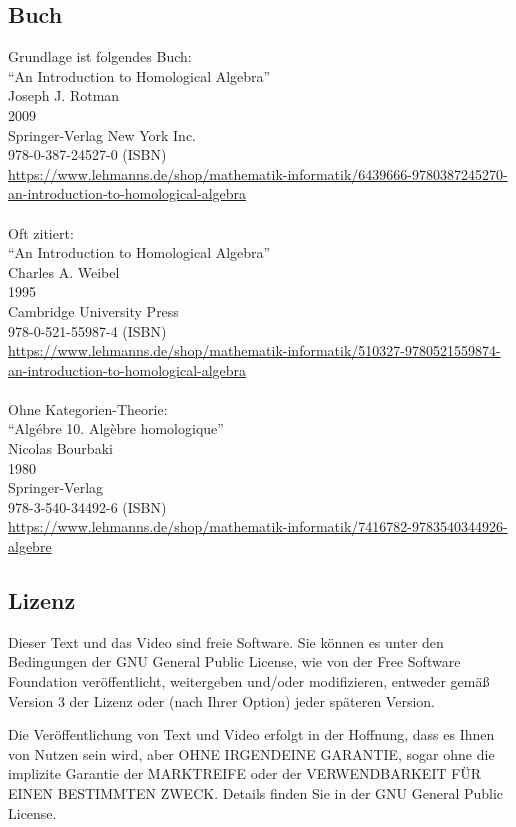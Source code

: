 \documentclass[a4paper]{amsart}
\theoremstyle{definition}
\begin{document}
\subsection*{Buch}
Grundlage ist folgendes Buch:\\
"`An Introduction to Homological Algebra"'\\
Joseph J. Rotman\\
2009\\
Springer-Verlag New York Inc.\\
978-0-387-24527-0 (ISBN)\\
{\tiny
   \url{https://www.lehmanns.de/shop/mathematik-informatik/6439666-9780387245270-an-introduction-to-homological-algebra}}\\
\\
Oft zitiert:\\
"`An Introduction to Homological Algebra"'\\
Charles A. Weibel\\
1995\\
Cambridge University Press\\
978-0-521-55987-4 (ISBN)\\
{\tiny
   \url{https://www.lehmanns.de/shop/mathematik-informatik/510327-9780521559874-an-introduction-to-homological-algebra}}\\
\\
Ohne Kategorien-Theorie:\\
"`Algébre 10. Algèbre homologique"'\\
Nicolas Bourbaki\\
1980\\
Springer-Verlag \\
978-3-540-34492-6 (ISBN)\\
{\tiny
   \url{https://www.lehmanns.de/shop/mathematik-informatik/7416782-9783540344926-algebre}}

\subsection*{Lizenz}
Dieser Text und das Video sind freie Software. Sie können es unter den Bedingungen der
GNU General Public License, wie von der Free Software Foundation veröffentlicht, weitergeben
und/oder modifizieren, entweder gemäß Version 3 der Lizenz oder (nach Ihrer Option) jeder späteren Version.

Die Veröffentlichung von Text und Video erfolgt in der Hoffnung, dass es Ihnen von Nutzen sein wird,
aber OHNE IRGENDEINE GARANTIE, sogar ohne die implizite Garantie der MARKTREIFE oder der
VERWENDBARKEIT FÜR EINEN BESTIMMTEN ZWECK. Details finden Sie in der GNU General Public License.
\end{document}
